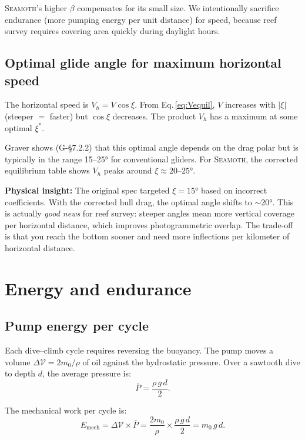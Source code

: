 \documentclass[11pt,a4paper]{article}
\newcommand{\seamoth}{\textsc{Seamoth}}
\newcommand{\insight}[1]{\par\smallskip\noindent\colorbox{green!8}{\parbox{\dimexpr\linewidth-2\fboxsep}{%
  \small\textbf{Physical insight:} #1}}\smallskip}
\begin{document}
\seamoth{}'s higher $\beta$ compensates for its small size.  We intentionally
sacrifice endurance (more pumping energy per unit distance) for speed, because
reef survey requires covering area quickly during daylight hours.

\subsection{Optimal glide angle for maximum horizontal speed}

The horizontal speed is $V_h = V\cos\xi$.  From Eq.\,\eqref{eq:Vequil},
$V$ increases with $|\xi|$ (steeper $=$ faster) but $\cos\xi$ decreases.  The
product $V_h$ has a maximum at some optimal $\xi^*$.

Graver shows (G-\S7.2.2) that this optimal angle depends on the drag polar but
is typically in the range 15--25° for conventional gliders.  For \seamoth{}, the
corrected equilibrium table shows $V_h$ peaks around $\xi\approx20$--$25°$.

\insight{The original spec targeted $\xi=15°$ based on incorrect coefficients.
With the corrected hull drag, the optimal angle shifts to $\sim$20°.  This is
actually \emph{good news} for reef survey: steeper angles mean more vertical
coverage per horizontal distance, which improves photogrammetric overlap.  The
trade-off is that you reach the bottom sooner and need more inflections per
kilometer of horizontal distance.}


\section{Energy and endurance}
\label{sec:energy}

\subsection{Pump energy per cycle}

Each dive--climb cycle requires reversing the buoyancy.  The pump moves a volume
$\Delta\mathcal{V} = 2m_0/\rho$ of oil against the hydrostatic pressure.
Over a sawtooth dive to depth $d$, the average pressure is:
\begin{equation}
  \bar{P} = \frac{\rho\,g\,d}{2}.
  \label{eq:Pavg}
\end{equation}

The mechanical work per cycle is:
\begin{equation}
  E_\text{mech} = \Delta\mathcal{V}\times\bar{P}
  = \frac{2m_0}{\rho}\times\frac{\rho\,g\,d}{2}
  = m_0\,g\,d.
  \label{eq:Emech}
\end{equation}
\end{document}
